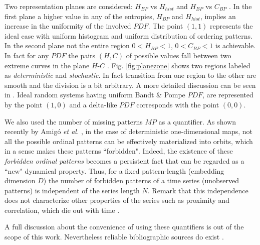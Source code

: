 Two representation planes are considered: $H_{BP}$ vs $H_{hist}$ \cite{DeMicco2008} and $H_{BP}$ vs $C_{BP}$ \cite{Rosso2007C}. In the first plane a higher value in any of the entropies, $H_{BP}$ and $H_{hist}$, implies an increase in the uniformity of the involved $PDF$. The point $(1,1)$ represents the ideal case with uniform histogram and uniform distribution of ordering patterns. In the second plane not the entire region $0<H_{BP}<1$, $0<C_{BP}<1$ is achievable. In fact for any $PDF$ the pairs $(H,C)$ of possible values fall between two extreme curves in the plane $H$-$C$ \cite{Anteneodo1996}. Fig. \ref{fig:planezone} shows two regions labeled as \textit{deterministic} and \textit{stochastic}. In fact transition from one region to the other are smooth and the division is a bit arbitrary. A more detailed discussion can be seen in \cite{Rosso2007C}. Ideal random systems having uniform Bandt \& Pompe $PDF$, are represented by the point $(1,0)$ \cite{Gonzalez2005} and a delta-like $PDF$ corresponds with the point $(0,0)$. 

We also used the number of missing patterns $MP$ as a quantifier\cite{Rosso2012}.
As shown recently by Amig\'o {\it et al.} \cite{Amigo2006,Amigo2007,Amigo2008,Amigo2010}, in the case of deterministic one-dimensional maps, not all the possible ordinal patterns can be effectively materialized into orbits, which in a sense makes these patterns ``forbidden".
Indeed, the existence of these {\it forbidden ordinal patterns} becomes a persistent fact that can be regarded as a ``new" dynamical property.
Thus, for a fixed pattern-length (embedding dimension $D$) the number of forbidden patterns of a time series (unobserved patterns) is independent of the series length $N$.
Remark that this independence does not characterize other properties of the series such as proximity and correlation, which die out with time \cite{Amigo2007,Amigo2010}.

A full discussion about the convenience of using these quantifiers is out of the scope of this work.
Nevertheless reliable bibliographic sources do exist \cite{Wackerbauer1994,Lopez1995,Rosso2007A,DeMicco2008,Rosso2009,Martin2006,Rosso2012}.


